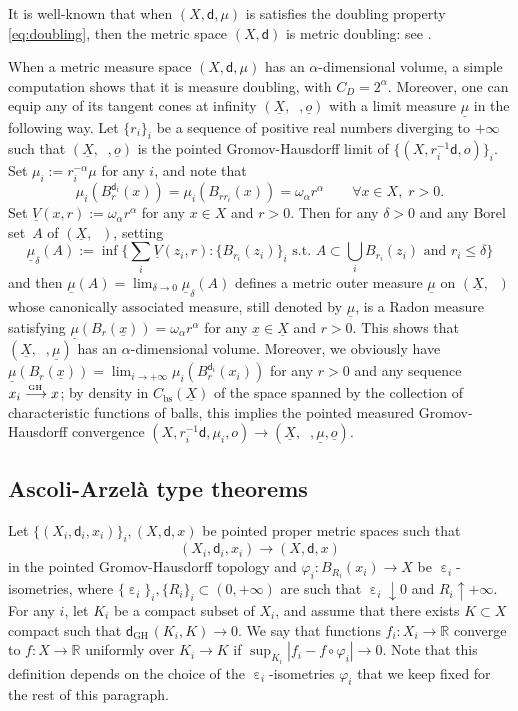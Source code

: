 \documentclass[10pt]{amsart}
\def\To#1{\mathchoice{\xrightarrow{\textstyle\kern4pt#1\kern3pt}}{\stackrel{#1}{\longrightarrow}}{}{}}
\newcommand{\sGH}{{\scriptscriptstyle\mathrm{GH}\,}}
\let\sep:
\theoremstyle{plain}
\theoremstyle{definition}
\newcommand{\setR}{\mathbb{R}}
\let\eps\upepsilon
\let\phi\varphi
\newcommand{\bs}{\mathrm{bs}}
\newcommand{\dist}{\mathsf{d}}
\newcommand{\uX}{\underline{X}}
\DeclareMathOperator{\udist}{\underline{\dist}}
\newcommand{\uo}{\underline{o}}
\newcommand{\ux}{\underline{x}}
\newcommand{\umu}{\underline{\mu}}
\begin{document}
It is well-known that when $(X,\dist,\mu)$ is satisfies the doubling property \eqref{eq:doubling}, then the metric space $(X,\dist)$ is metric doubling: see \eg \cite[\S 2.5]{AmbrosioColomboDiMarino}.

When a metric measure space $(X,\dist,\mu)$ has an $\alpha$-dimensional volume, a simple computation shows that it is measure doubling, with $C_D=2^\alpha$. Moreover, one can equip any of its tangent cones at infinity $(\uX,\udist,\uo)$ with a limit measure $\umu$ in the following way. Let $\{r_i\}_i$ be a sequence of positive real numbers diverging to $+\infty$ such that $(\uX,\udist,\uo)$ is the pointed Gromov-Hausdorff limit of $\{(X,r_i^{-1}\dist,o)\}_i$. Set $\mu_i:=r_i^{-\alpha}\mu$ for any $i$, and note that
\[
\mu_i(B_r^{\dist_i}(x)) = \mu_i(B_{r r_i}(x)) = \omega_\alpha r^\alpha \qquad \forall x \in X,\; r>0.
\]
Set $\underline{V}(x,r):=\omega_\alpha r^\alpha$ for any $x \in X$ and $r>0$. Then for any $\delta>0$ and any Borel set~$A$ of $(\uX,\udist)$, setting
\[\textstyle
\umu_\delta(A):= \inf\bigl\{ \sum_{i} \underline{V}(z_i,r) \sep \{B_{r_i}(z_i)\}_i\, \, \text{s.t. $A \subset \bigcup_i B_{r_i}(z_i)$ and $r_i \le \delta$} \bigr\}
\]
and then $\umu(A) = \lim_{\delta \to 0} \umu_\delta(A)$ defines a metric outer measure $\umu$ on $(\uX,\udist)$ whose canonically associated measure, still denoted by $\umu$, is a Radon measure satisfying $\umu(B_r(\ux)) = \omega_\alpha r^\alpha$ for any $\ux \in \uX$ and $r>0$. This shows that $(\uX,\udist,\umu)$ has an $\alpha$\nobreakdash-dimen\-sional volume. Moreover, we obviously have $\umu(B_r(\ux))=\lim_{i \to +\infty} \mu_i(B_r^{\dist_i}(x_i))$ for any $r>0$ and any sequence $x_i \To{\sGH} x$; by density in $C_\bs(\uX)$ of the space spanned by the collection of characteristic functions of balls, this implies the pointed measured Gromov-Hausdorff convergence $(X,r_i^{-1}\dist,\mu_i,o) \to (\uX,\udist,\umu,\uo)$.

\subsection*{Ascoli-Arzelà type theorems}

Let $\{(X_i,\dist_i,x_i)\}_i, (X,\dist,x)$ be pointed proper metric spaces such that
\[
(X_i,\dist_i,x_i) \to (X,\dist,x)
\]
in the pointed Gromov-Hausdorff topology and $\phi_i:B_{R_i}(x_i) \to X$ be $\eps_i$-isometries, where $\{\eps_i\}_i, \{R_i\}_i \subset (0,+\infty)$ are such that $\eps_i \downarrow 0$ and $R_i \uparrow +\infty$. For any $i$, let $K_i$ be a compact subset of $X_i$, and assume that there exists $K \subset X$ compact such that $\dist_{\sGH}(K_i,K) \to 0$. We say that functions $f_i:X_i\to\setR$ converge to $f:X\to\setR$ uniformly over $K_i \to K$ if $\sup_{K_i} |f_i - f \circ \phi_i| \to 0$. Note that this definition depends on the choice of the $\eps_i$-isometries $\phi_i$ that we keep fixed for the rest of this paragraph.
\end{document}
